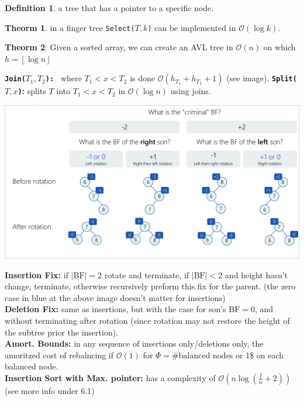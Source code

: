 \documentclass[]{article}
\theoremstyle{definition}
\newtheorem{Theorem}{\color{theoColor}Theorm}
\newtheorem{Definition}{\color{defiColor}Definition}
\newcommand\theo  [1] {\begin{Theorem}#1\end{Theorem}}
\newcommand\oc    {\mathcal{O}}
\newcommand\rf    {\right\rfloor}
\newcommand\lf    {\left\lfloor}
\newcommand\floor [1] {\lf #1 \rf}
\newcommand\logn      {\log n}
\newcommand\sof[1]    {\left | #1 \right |}
\newcommand\cl [1]    {\left ( #1 \right )}
\begin{document}
\begin{multicols}{4}
				\begin{Definition}
					a tree that has a pointer to a specific node. 
				\end{Definition}
				\theo{in a finger tree \texttt{Select($T, k$)} can be implemented in $\oc(\log k)$. }
				\theo{Given a sorted array, we can create an AVL tree in $\oc(n)$ on which $h = \floor{\logn}$}
				\textbf{\texttt{Join($T_1, T_2$): }} where $T_1 < x < T_2$ is done $\oc(h_{T_1} + h_{T_2} + 1)$ (see image). 
				\textbf{\texttt{Split($T, x$)}: }splits $T$ into $T_1 < x < T_2$ in $\oc(\logn)$ using joins. 
				\begin{center}
					\includegraphics[width=0.8\linewidth]{images/rotationTableDeletion}
				\end{center}
				\textbf{Insertion Fix: }if $\sof{\mathrm{BF}} = 2$ rotate and terminate, if $|\mathrm{BF}| < 2$ and height hasn't change, terminate, otherwise recursively preform this fix for the parent. (the zero case in blue at the above image doesn't matter for insertions) \\
				\textbf{Deletion Fix: }same as insertions, but with the case for son's $\mathrm{BF}=0$, and without terminating after rotation (since rotation may not restore the height of the subtree prior the insertion). \\
				\textbf{Amort. Bounds: }in any sequence of insertions only/deletions only, the amoritzed cost of rebalncing if $\oc(1)$ for $\Phi = \# \text{balanced nodes}$ or 1\$ on each balanced node. \\
				\textbf{Insertion Sort with Max. pointer: }has a complexity of $\oc\cl{n \log\cl{\frac{I}{n} + 2}}$ (see more info under 6.1)
			

\end{multicols}
\end{document}
